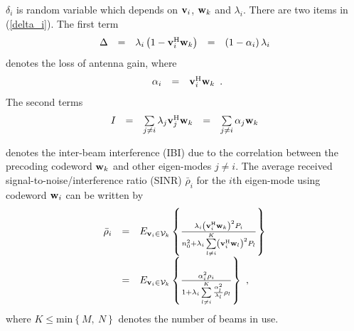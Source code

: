\documentclass[10pt,fleqn, twocolumn]{IEEEtran}
\newcommand{\bv}{{\bf v}}
\newcommand{\bw}{{\bf w}}
\begin{document}
$\delta_{i}$ is random variable which depends on $\bv_{i}$,
$\bw_{k}$ and $\lambda_{i}$. There are two items in
(\ref{delta_i}). The first term
\begin{equation}
\begin{array}{rcccl}
\Delta&=&\lambda_{i}\left(1-\bv_{i}^{\rm
H}\bw_k\right)&=&\left(1-\alpha_{i}\right)\lambda_{i}
\end{array}
\end{equation}
\noindent denotes the loss of antenna gain, where
\begin{equation}
\begin{array}{rcl}
\alpha_{i}&=&\bv_{i}^{\rm H}\bw_k
\end{array}.\label{alpha}
\end{equation}
\noindent The second terms
\begin{equation}
\begin{array}{rcccl}
I_{} & = & \sum\limits_{j\neq i}\lambda_{j}\bv_{j}^{\rm
H}\bw_{k}&=&\sum\limits_{j\neq i}\alpha_{j}\bw_{k}
\end{array}\label{IBI}
\end{equation}

\noindent denotes the inter-beam interference (IBI) due to the
correlation between the precoding codeword $\bw_{k}$ and other
eigen-modes $j\neq i$. The average received
signal-to-noise/interference ratio (SINR) $\bar\rho_{i}$ for the
$i$th eigen-mode using codeword $\bw_{i}$ can be written by
\begin{equation}
\begin{array}{rcl}
\bar\rho_{i}&=&\mbox{E}_{\bv_{i}\in{\cal
V}_{k}}\left\{\frac{\lambda_{i}\left(\bv_{i}^{\rm
H}\bw_{k}\right)^2P_{i}}{n_{0}^2+ \lambda_{i}\sum\limits_{l\neq
i}^{K}\left(\bv_{i}^{\rm H}\bw_{l}\right)^{2}P_{l}}\right\}\\
&=&\mbox{E}_{\bv_{i}\in{\cal
V}_{k}}\left\{\frac{\alpha_{i}^{2}\rho_{i}}{1+
\lambda_{i}\sum\limits_{l\neq
i}^{K}\frac{\alpha_{l}^{2}}{\lambda_{l}}\rho_{l}}\right\}\ ,
\end{array}
\end{equation}
\noindent where $K\leq\mbox{min}\left\{M,\ N\right\}$ denotes the
number of beams in use.
\end{document}
